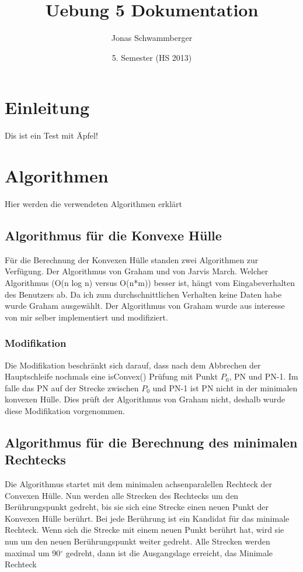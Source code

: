 \documentclass[10pt]{article}
\title{
	\vspace{5cm}
	Uebung 5 Dokumentation
}
\author{Jonas Schwammberger}
\date{5. Semester (HS 2013)}
\begin{document}
\maketitle
\thispagestyle{fancy}

\newpage

\tableofcontents	  	


\newpage
\setcounter{page}{1}


\section{Einleitung}
Dis ist ein Test mit Äpfel!
\section{Algorithmen}
Hier werden die verwendeten Algorithmen erklärt
\subsection{Algorithmus für die Konvexe Hülle}
Für die Berechnung der Konvexen Hülle standen zwei Algorithmen zur Verfügung. Der Algorithmus von Graham und von Jarvis March. Welcher Algorithmus (O(n log n) versus O(n*m)) besser ist, hängt vom Eingabeverhalten des Benutzers ab. Da ich zum durchschnittlichen Verhalten keine Daten habe wurde Graham ausgewählt. Der Algorithmus von Graham wurde aus interesse von mir selber implementiert und modifiziert.

\subsubsection{Modifikation}
Die Modifikation beschränkt sich darauf, dass nach dem Abbrechen der Hauptschleife nochmals eine isConvex() Prüfung mit Punkt $P_{0}$, PN und PN-1. Im falle das PN auf der Strecke zwischen $P_{0}$ und PN-1 ist PN nicht in der minimalen konvexen Hülle. Dies prüft der Algorithmus von Graham nicht, deshalb wurde diese Modifikation vorgenommen.

\subsection{Algorithmus für die Berechnung des minimalen Rechtecks}
Die Algorithmus startet mit dem minimalen achsenparalellen Rechteck der Convexen Hülle. Nun werden alle Strecken des Rechtecks um den Berührungspunkt gedreht, bis sie sich eine Strecke einen neuen Punkt der Konvexen Hülle berührt. Bei jede Berührung ist ein Kandidat für das minimale Rechteck. Wenn sich die Strecke mit einem neuen Punkt berührt hat, wird sie nun um den neuen Berührungspunkt weiter gedreht. Alle Strecken werden maximal um 90$^\circ$ gedreht, dann ist die Ausgangslage erreicht, das Minimale Rechteck
\end{document}
